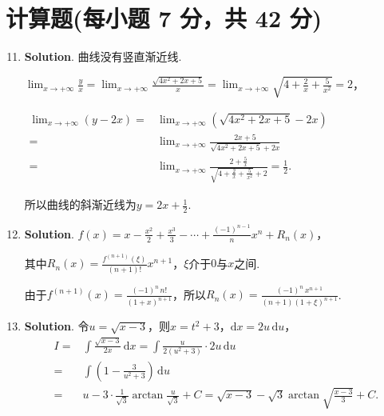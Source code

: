 \documentclass[../Main.tex]{subfiles}
\begin{document}
\section{计算题(每小题 7 分，共 42 分)}
\begin{enumerate}
    \setcounter{enumi}{10}
    \item \textbf{Solution}. 曲线没有竖直渐近线.

          $\lim_{x\to+\infty}\frac{y}{x}=\lim_{x\to+\infty}\frac{\sqrt{4x^{2}+2x+5}}{x}
              =\lim_{x\to+\infty}\sqrt{4+\frac{2}{x}+\frac{5}{x^{2}}}=2$，

          $\begin{aligned}
                  \lim_{x\to+\infty}(y-2x)= & \lim_{x\to+\infty}\left(\sqrt{4x^2+2x+5}-2x\right)                                        \\
                  =                         & \lim_{x\to+\infty}\frac{2x+5}{\sqrt{4x^2+2x+5}+2x}                                        \\
                  =                         & \lim_{x\to+\infty}\frac{2+\frac{5}{x}}{\sqrt{4+\frac{2}{x}+\frac{5}{x^2}}+2}=\frac{1}{2}.
              \end{aligned}$

          所以曲线的斜渐近线为$y=2x+\frac{1}{2}$.

    \item \textbf{Solution}. $f(x)=x-\frac{x^{2}}{2}+\frac{x^{3}}{3}-\cdots +
              \frac{(-1)^{n-1}}{n}x^{n}+R_{n}(x)$，

          其中$R_{n}(x)=\frac{f^{(n+1)}(\xi)}{(n+1)!}x^{n+1}$，$\xi$介于$0$与$x$之间.

          由于$f^{(n+1)}(x)=\frac{(-1)^{n}\,n!}{(1+x)^{n+1}}$，所以$R_{n}(x)=\frac{(-1)^{n}\,x^{n+1}}{(n+1)(1+\xi)^{n+1}}$.

    \item \textbf{Solution}. 令$u=\sqrt{x-3}$，则$x=t^{2}+3$，$\mathrm{d}x=2
              u\,\mathrm{d}u$，
          \[
              \begin{aligned}
                  I = & \int \frac{\sqrt{x-3}}{2x}\,\mathrm{d}x = \int \frac{u}{2(u^2+3)}\cdot 2u\,\mathrm{d}u                     \\
                  =   & \int \left(1-\frac{3}{u^2+3}\right)\,\mathrm{d}u                                                           \\
                  =   & u-3\cdot\frac{1}{\sqrt{3}}\arctan\frac{u}{\sqrt{3}}+ C = \sqrt{x-3}-\sqrt{3}\arctan\sqrt{\frac{x-3}{3}}+C.
              \end{aligned}
          \]


\end{enumerate}
\end{document}
